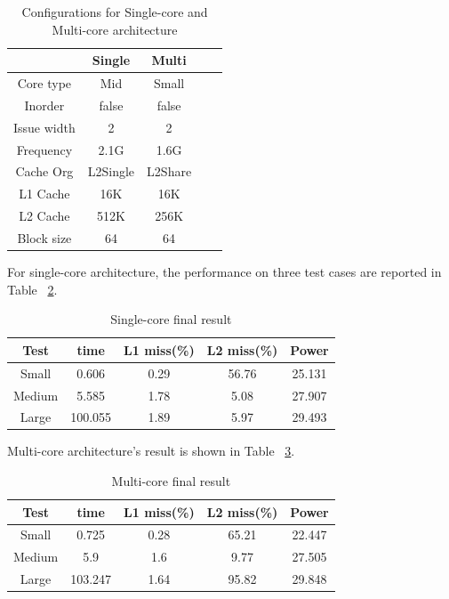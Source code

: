 \documentclass[twocolumn,letterpaper,10pt]{article}
\begin{document}
\begin{table}[ht!]
\begin{center}
\begin{tabular}{ccccc}
\toprule
& Single & Multi \\
\midrule
Core type & Mid & Small \\
Inorder & false & false \\
Issue width & 2 & 2 \\
Frequency & 2.1G & 1.6G \\
Cache Org & L2Single & L2Share \\
L1 Cache & 16K & 16K \\
L2 Cache & 512K & 256K \\
Block size & 64 & 64 \\
\bottomrule
\end{tabular}
\end{center}
\caption{Configurations for Single-core and Multi-core architecture}
\label{table:config}
\end{table}

For single-core architecture, the performance on three test cases are
reported in Table ~\ref{table:single}.

\begin{table}[ht!]
\begin{center}
\begin{tabular}{ccccc}
\toprule
Test  & time & L1 miss(\%)  & L2 miss(\%) & Power \\
\midrule
Small & 0.606 & 0.29 & 56.76& 25.131 \\
Medium  & 5.585 & 1.78 & 5.08 & 27.907 \\
Large & 100.055 & 1.89 & 5.97 & 29.493 \\
\bottomrule
\end{tabular}
\end{center}
\caption{Single-core final result}
\label{table:single}
\end{table}


Multi-core architecture's result is shown in Table ~\ref{table:multi}.
\begin{table}[ht!]
\begin{center}
\begin{tabular}{ccccc}
\toprule
Test  & time & L1 miss(\%)  & L2 miss(\%) & Power \\
\midrule
Small &  0.725 & 0.28 & 65.21 & 22.447 \\
Medium  & 5.9 & 1.6 & 9.77 & 27.505 \\
Large  & 103.247 & 1.64 & 95.82  & 29.848 \\
\bottomrule
\end{tabular}
\end{center}
\caption{Multi-core final result}
\label{table:multi}
\end{table}
\end{document}
